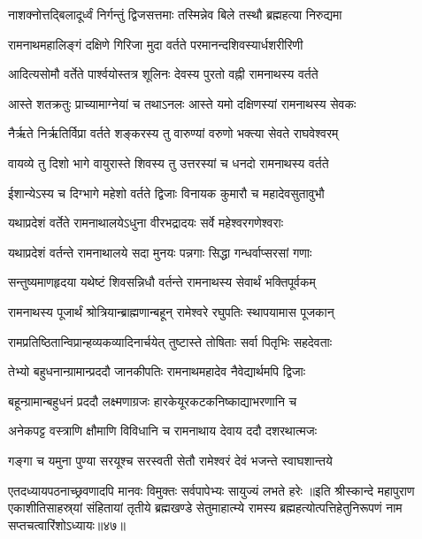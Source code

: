 \twolineshloka
{नाशक्नोत्तद्बिलादूर्ध्वं निर्गन्तुं द्विजसत्तमाः}
{तस्मिन्नेव बिले तस्थौ ब्रह्महत्या निरुद्यमा}%

\twolineshloka
{रामनाथमहालिङ्गं दक्षिणे गिरिजा मुदा}
{वर्तते परमानन्दशिवस्यार्धशरीरिणी}%

\twolineshloka
{आदित्यसोमौ वर्तेते पार्श्वयोस्तत्र शूलिनः}
{देवस्य पुरतो वह्नी रामनाथस्य वर्तते}%

\twolineshloka
{आस्ते शतक्रतुः प्राच्यामाग्नेयां च तथाऽनलः}
{आस्ते यमो दक्षिणस्यां रामनाथस्य सेवकः}%

\twolineshloka
{नैर्ऋते निर्ऋतिर्विप्रा वर्तते शङ्करस्य तु}
{वारुण्यां वरुणो भक्त्या सेवते राघवेश्वरम्}%

\twolineshloka
{वायव्ये तु दिशो भागे वायुरास्ते शिवस्य तु}
{उत्तरस्यां च धनदो रामनाथस्य वर्तते}%

\twolineshloka
{ईशान्येऽस्य च दिग्भागे महेशो वर्तते द्विजाः}
{विनायक कुमारौ च महादेवसुतावुभौ}%

\twolineshloka
{यथाप्रदेशं वर्तेते रामनाथालयेऽधुना}
{वीरभद्रादयः सर्वे महेश्वरगणेश्वराः}%

\twolineshloka
{यथाप्रदेशं वर्तन्ते रामनाथालये सदा}
{मुनयः पन्नगाः सिद्धा गन्धर्वाप्सरसां गणाः}%

\twolineshloka
{सन्तुष्यमाणहृदया यथेष्टं शिवसन्निधौ}
{वर्तन्ते रामनाथस्य सेवार्थं भक्तिपूर्वकम्}%

\twolineshloka
{रामनाथस्य पूजार्थं श्रोत्रियान्ब्राह्मणान्बहून्}
{रामेश्वरे रघुपतिः स्थापयामास पूजकान्}%

\twolineshloka
{रामप्रतिष्ठितान्विप्रान्हव्यकव्यादिनार्चयेत्}
{तुष्टास्ते तोषिताः सर्वा पितृभिः सहदेवताः}%

\twolineshloka
{तेभ्यो बहुधनान्ग्रामान्प्रददौ जानकीपतिः}
{रामनाथमहादेव नैवेद्यार्थमपि द्विजाः}%

\twolineshloka
{बहून्ग्रामान्बहुधनं प्रददौ लक्ष्मणाग्रजः}
{हारकेयूरकटकनिष्काद्याभरणानि च}%

\twolineshloka
{अनेकपट्ट वस्त्राणि क्षौमाणि विविधानि च}
{रामनाथाय देवाय ददौ दशरथात्मजः}%

\twolineshloka
{गङ्गा च यमुना पुण्या सरयूश्च सरस्वती}
{सेतौ रामेश्वरं देवं भजन्ते स्वाघशान्तये}%

\twolineshloka
{एतदध्यायपठनाच्छ्रवणादपि मानवः}
{विमुक्तः सर्वपापेभ्यः सायुज्यं लभते हरेः}%
॥इति श्रीस्कान्दे महापुराण एकाशीतिसाहस्र्यां संहितायां तृतीये ब्रह्मखण्डे सेतुमाहात्म्ये रामस्य ब्रह्महत्योत्पत्तिहेतुनिरूपणं नाम सप्तचत्वारिंशोऽध्यायः॥४७॥